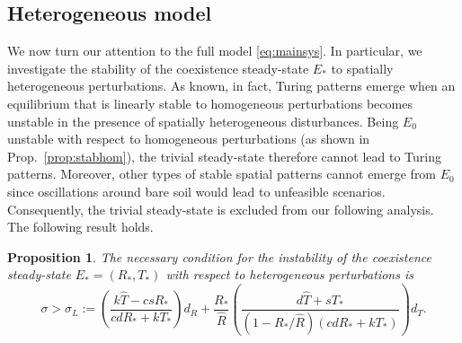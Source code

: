 \documentclass[11pt]{elsarticle}
\theoremstyle{plain}
\newtheorem{prop}[thm]{Proposition}
\theoremstyle{definition}
\theoremstyle{myremark}
\begin{document}
\subsection{Heterogeneous model}
We now turn our attention to the full model \eqref{eq:mainsys}. In particular, we investigate the stability of the coexistence steady-state $E_*$ to spatially heterogeneous perturbations. As known, in fact, Turing patterns emerge when an equilibrium that is linearly stable to homogeneous perturbations becomes unstable in the presence of spatially heterogeneous disturbances. Being $E_0$ unstable with respect to homogeneous perturbations (as shown in Prop.~\ref{prop:stabhom}), the trivial steady-state therefore cannot lead to Turing patterns. Moreover, other types of stable spatial patterns cannot emerge from $E_0$ since oscillations around bare soil would lead to unfeasible scenarios. Consequently, the trivial steady-state is excluded from our following analysis.\\
The following result holds.
\begin{prop} \label{prop:stabcross}
    The necessary condition for the instability of the coexistence steady-state ${E_*=(R_*,T_*)}$ with respect to heterogeneous perturbations is
    \begin{equation} \label{eq:condTur}
    \sigma > \sigma_L:=
    \left(\dfrac{k\hat{T}-csR_*}{cdR_*+kT_*}\right)d_R 
    + \dfrac{R_*}{\hat{R}}\left(\dfrac{d\hat{T}+sT_*}{(1-R_*/\hat{R})(cdR_*+kT_*)} \right)d_T.
\end{equation}
\end{prop}
\end{document}
